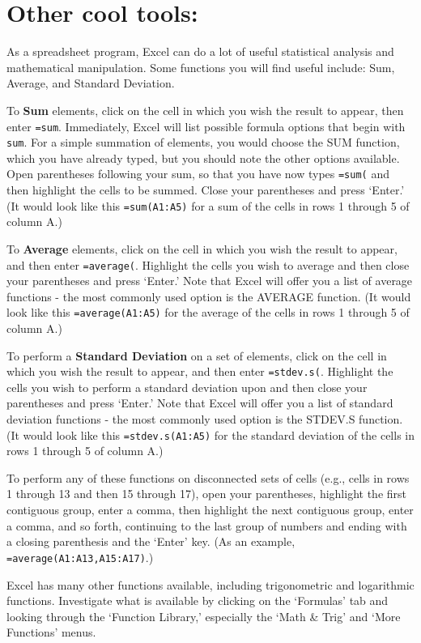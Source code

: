 \section*{Other cool tools:}
As a spreadsheet program, Excel can do a lot of useful statistical analysis and mathematical manipulation. 
Some functions you will find useful include: Sum, Average, and Standard Deviation.
\par 
To \textbf{Sum} elements, click on the cell in which you wish the result to appear, then enter \texttt{=sum}. 
Immediately, Excel will list possible formula options that begin with \texttt{sum}. 
For a simple summation of elements, you would choose the SUM function, which you have already typed, but you should note the other options available. 
Open parentheses following your sum, so that you have now types \texttt{=sum(} and then highlight the cells to be summed. 
Close your parentheses and press `Enter.' 
(It would look like this \texttt{=sum(A1:A5)} for a sum of the cells in rows 1 through 5 of column A.)
\par 
To \textbf{Average} elements, click on the cell in which you wish the result to appear, and then enter \texttt{=average(}. Highlight the cells you wish to average and then close your parentheses and press `Enter.' 
Note that Excel will offer you a list of average functions - the most commonly used option is the AVERAGE function. (It would look like this \texttt{=average(A1:A5)} for the average of the cells in rows 1 through 5 of column A.)
\par 
To perform a \textbf{Standard Deviation} on a set of elements, click on the cell in which you wish the result to appear, and then enter \texttt{=stdev.s(}. 
Highlight the cells you wish to perform a standard deviation upon and then close your parentheses and press `Enter.' 
Note that Excel will offer you a list of standard deviation functions - the most commonly used option is the STDEV.S function. 
(It would look like this \texttt{=stdev.s(A1:A5)} for the standard deviation of the cells in rows 1 through 5 of column A.)
\par 
To perform any of these functions on disconnected sets of cells (e.g., cells in rows 1 through 13 and then 15 through 17), open your parentheses, highlight the first contiguous group, enter a comma, then highlight the next contiguous group, enter a comma, and so forth, continuing to the last group of numbers and ending with a closing parenthesis and the `Enter' key. 
(As an example, \texttt{=average(A1:A13,A15:A17)}.)
\par 
Excel has many other functions available, including trigonometric and logarithmic functions. 
Investigate what is available by clicking on the `Formulas' tab and looking through the `Function Library,' especially the `Math \& Trig' and `More Functions' menus.

